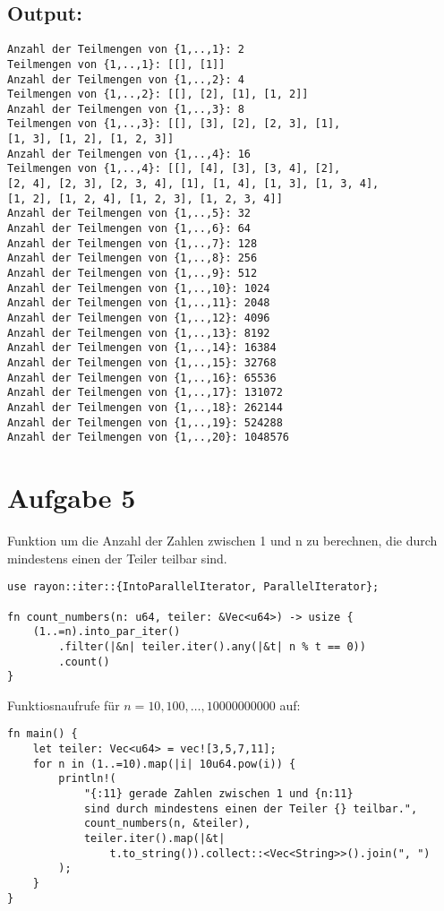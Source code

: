 \documentclass[a4paper]{scrartcl}
\begin{document}
\subsection*{Output:}
\begin{lstlisting}
Anzahl der Teilmengen von {1,..,1}: 2
Teilmengen von {1,..,1}: [[], [1]]
Anzahl der Teilmengen von {1,..,2}: 4
Teilmengen von {1,..,2}: [[], [2], [1], [1, 2]]
Anzahl der Teilmengen von {1,..,3}: 8
Teilmengen von {1,..,3}: [[], [3], [2], [2, 3], [1], 
[1, 3], [1, 2], [1, 2, 3]]
Anzahl der Teilmengen von {1,..,4}: 16
Teilmengen von {1,..,4}: [[], [4], [3], [3, 4], [2], 
[2, 4], [2, 3], [2, 3, 4], [1], [1, 4], [1, 3], [1, 3, 4], 
[1, 2], [1, 2, 4], [1, 2, 3], [1, 2, 3, 4]]
Anzahl der Teilmengen von {1,..,5}: 32
Anzahl der Teilmengen von {1,..,6}: 64
Anzahl der Teilmengen von {1,..,7}: 128
Anzahl der Teilmengen von {1,..,8}: 256
Anzahl der Teilmengen von {1,..,9}: 512
Anzahl der Teilmengen von {1,..,10}: 1024
Anzahl der Teilmengen von {1,..,11}: 2048
Anzahl der Teilmengen von {1,..,12}: 4096
Anzahl der Teilmengen von {1,..,13}: 8192
Anzahl der Teilmengen von {1,..,14}: 16384
Anzahl der Teilmengen von {1,..,15}: 32768
Anzahl der Teilmengen von {1,..,16}: 65536
Anzahl der Teilmengen von {1,..,17}: 131072
Anzahl der Teilmengen von {1,..,18}: 262144
Anzahl der Teilmengen von {1,..,19}: 524288
Anzahl der Teilmengen von {1,..,20}: 1048576
\end{lstlisting}

\newpage
\section*{Aufgabe 5}
Funktion um die Anzahl der Zahlen zwischen 1 und n zu berechnen, die durch mindestens einen der Teiler teilbar sind.
\begin{lstlisting}
use rayon::iter::{IntoParallelIterator, ParallelIterator};

fn count_numbers(n: u64, teiler: &Vec<u64>) -> usize {
    (1..=n).into_par_iter()
        .filter(|&n| teiler.iter().any(|&t| n % t == 0))
        .count()
}   
\end{lstlisting}

Funktiosnaufrufe für $ n = 10, 100 , \ldots, 10000000000 $ auf:

\begin{lstlisting}
fn main() {
    let teiler: Vec<u64> = vec![3,5,7,11];
    for n in (1..=10).map(|i| 10u64.pow(i)) {
        println!(
            "{:11} gerade Zahlen zwischen 1 und {n:11} 
            sind durch mindestens einen der Teiler {} teilbar.", 
            count_numbers(n, &teiler), 
            teiler.iter().map(|&t| 
                t.to_string()).collect::<Vec<String>>().join(", ")
        );
    }  
} 
\end{lstlisting}
\end{document}
